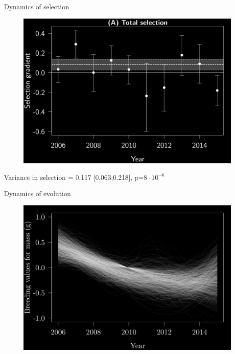 \documentclass[10pt]{beamer}%
\begin{document}
\begin{frame}{Dynamics of selection}
	\begin{figure}
		\includegraphics[width=\textwidth]{Figures/SelByYear-1}
	\end{figure}
	Variance in selection = 0.117 [0.063;0.218], p=$8\cdot10^{-6}$
\end{frame}

\begin{frame}{Dynamics of evolution}
	\begin{figure}
		\includegraphics[width=\textwidth]{Figures/EvolSmooth-1}
	\end{figure}
\end{frame}
\end{document}
